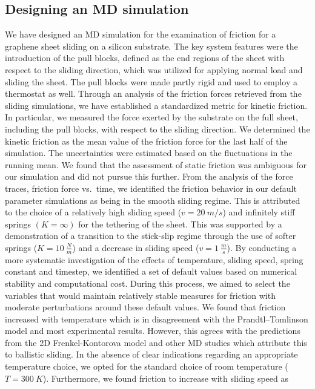 \subsection{Designing an MD simulation}
We have designed an \acrshort{MD} simulation for the examination of friction for
a graphene sheet sliding on a silicon substrate. The key system features were
the introduction of the pull blocks, defined as the end regions of the sheet
with respect to the sliding direction, which was utilized for applying normal
load and sliding the sheet. The pull blocks were made partly rigid and used to
employ a thermostat as well. Through an analysis of the friction forces retrieved from the sliding simulations, we have established a standardized metric for kinetic friction. In particular, we measured the force exerted by the substrate on the full sheet, including the pull blocks, with respect to the sliding direction. We determined the kinetic friction as the mean value of the friction force for the last half of the simulation. The uncertainties were estimated based on the fluctuations in the running mean. We found that the assessment of static friction was ambiguous for our simulation and did not pursue this further. From the analysis of the
force traces, friction force vs.\ time, we identified the friction behavior in our
default parameter simulations as being in the smooth sliding regime. This is attributed to the choice of a relatively high sliding speed ($v=\SI{20}{m/s}$) and infinitely stiff springs $(K = \infty)$ for the tethering of the sheet. This was supported by a demonstration of a transition to the stick-slip regime through the use of softer springs ($K = \SI{10}{\frac{N}{m}}$) and a decrease in sliding speed ($v = \SI{1}{\frac{m}{s}}$). By conducting a more systematic investigation of the
effects of temperature, sliding speed, spring constant and timestep, we identified a set of default values based on numerical stability and computational cost. During this process, we aimed to select the variables that would maintain relatively stable measures for friction with moderate perturbations around these default values. We found that friction increased with temperature which is in disagreement with the Prandtl–Tomlinson model and most experimental results. However, this agrees with the predictions from the 2D Frenkel-Kontorova model and other \acrshort{MD} studies which attribute this to ballistic sliding. In the absence of clear indications regarding an appropriate temperature choice, we opted for the standard choice of room temperature ($T=\SI{300}{K}$). Furthermore, we found friction to increase with sliding speed as
